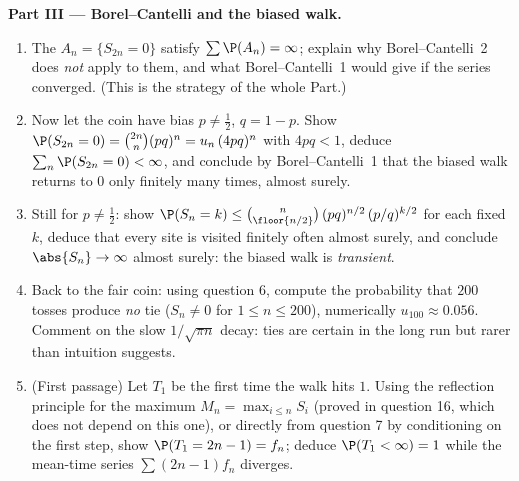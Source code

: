 \begin{problem}
\medskip
\noindent\textbf{Part III --- Borel--Cantelli and the biased
walk.}
\begin{enumerate}[resume]
  \item The  $A_n = \{S_{2n} = 0\}$ satisfy $\sum\P(A_n)
        = \infty$; explain why Borel--Cantelli~2 does
        \emph{not} apply to them, and what Borel--Cantelli~1
        would give if the series converged. (This is the
        strategy of the whole Part.)
  \item Now let the coin have bias $p \neq \frac12$, $q = 1 -
        p$. Show $\P(S_{2n} = 0) = \binom{2n}n(pq)^n =
        u_n\,(4pq)^n$ with $4pq < 1$, deduce
        $\sum_n\P(S_{2n} = 0) < \infty$, and conclude by
        Borel--Cantelli~1 that the biased walk returns to $0$
        only finitely many times, almost surely.
  \item Still for $p \neq \frac12$: show $\P(S_n = k) \leq
        \binom{n}{\floor{n/2}}\,(pq)^{n/2}\,(p/q)^{k/2}$ for
        each fixed $k$, deduce that every site is visited
        finitely often almost surely, and conclude
        $\abs{S_n} \to \infty$ almost surely: the biased walk
        is \emph{transient}.
  \item Back to the fair coin: using question 6, compute the
        probability that $200$ tosses produce \emph{no} tie
        ($S_n \neq 0$ for $1 \leq n \leq 200$), numerically
        $u_{100} \approx 0.056$. Comment on the slow
        $1/\sqrt{\pi n}$ decay: ties are certain in the long
        run but rarer than intuition suggests.
  \item (First passage) Let $T_1$ be the first time the walk
        hits $1$. Using the reflection principle for the
        maximum $M_n = \max_{i\leq n}S_i$ (proved in question
        16, which does not depend on this one), or directly
        from question 7 by conditioning on the first step,
        show $\P(T_1 = 2n - 1) = f_n$; deduce $\P(T_1 <
        \infty) = 1$ while the mean-time series
        $\sum(2n-1)f_n$ diverges.
\end{enumerate}


\end{problem}

